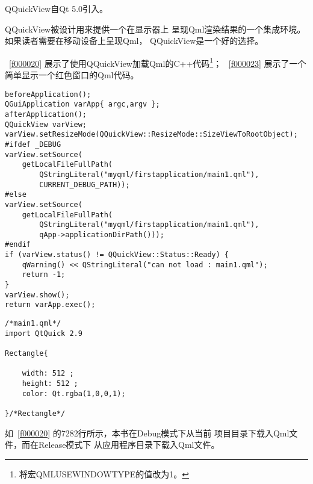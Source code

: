 QQuickView自Qt 5.0引入。

QQuickView被设计用来提供一个在显示器上
呈现Qml渲染结果的一个集成环境。
如果读者需要在移动设备上呈现Qml，
QQuickView是一个好的选择。

\lstlistingname\ \ref{f000020}
展示了使用QQuickView加载Qml的C{\sourcefonttwo{}+}{\sourcefonttwo{}+}代码\footnote{
将宏QML\underline{\hspace{0.5em}}USE\underline{\hspace{0.5em}}WINDOW\underline{\hspace{0.5em}}TYPE的值改为1。
}；
\lstlistingname\ \ref{f000023}
展示了一个简单显示一个红色窗口的Qml代码。

\FloatBarrier
\begin{lstlisting}[label=f000020,
caption=GoodLuck,
title=\lstlistingname\ \thelstlisting\marginnote{\fbox{\footnotesize{\lstlistingname\ \thelstlisting}}}
,firstnumber=67]
beforeApplication();
QGuiApplication varApp{ argc,argv };
afterApplication();
QQuickView varView;
varView.setResizeMode(QQuickView::ResizeMode::SizeViewToRootObject);
#ifdef _DEBUG
varView.setSource(
    getLocalFileFullPath(
        QStringLiteral("myqml/firstapplication/main1.qml"),
        CURRENT_DEBUG_PATH));
#else
varView.setSource(
    getLocalFileFullPath(
        QStringLiteral("myqml/firstapplication/main1.qml"),
        qApp->applicationDirPath()));
#endif
if (varView.status() != QQuickView::Status::Ready) {
    qWarning() << QStringLiteral("can not load : main1.qml");
    return -1;
}
varView.show();
return varApp.exec();
\end{lstlisting}          %
\FloatBarrier
\begin{lstlisting}[label=f000023,
caption=GoodLuck,
title=\lstlistingname\ \thelstlisting\marginnote{\fbox{\footnotesize{\lstlistingname\ \thelstlisting}}}
]
/*main1.qml*/
import QtQuick 2.9

Rectangle{

    width: 512 ;
    height: 512 ;
    color: Qt.rgba(1,0,0,1);

}/*Rectangle*/
\end{lstlisting}          %

如\lstlistingname\ \ref{f000020}
的72\raisebox{0.16ex}{\sourcefonttwo\~{}}82行所示，本书在Debug模式下从当前
项目目录下载入Qml文件，而在Release模式下
从应用程序目录下载入Qml文件。

